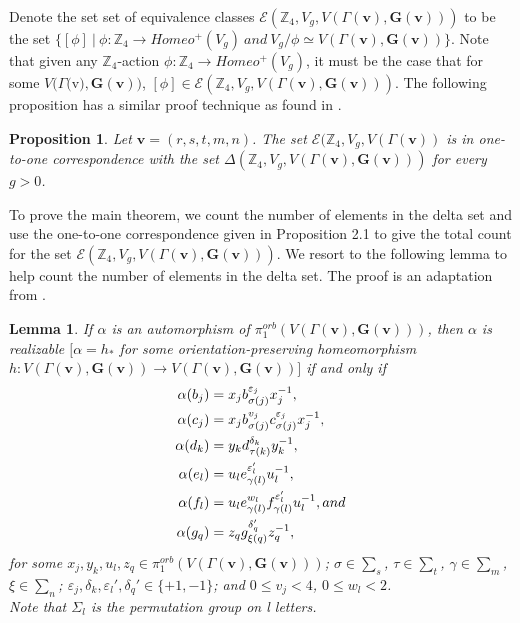 \documentclass{amsart}
\newtheorem{lemma}[theorem]{Lemma}
\newtheorem{proposition}[theorem]{Proposition}
\theoremstyle{definition}
\numberwithin{equation}{section}
\begin{document}
Denote the  set set of equivalence classes $\mathscr{E}(\mathbb{Z}_{4},V_g,V(\Gamma({\mathbf{v}}),{\mathbf{G(v)}}))$ to be the set  $\{[\phi]\ |\ \phi:\mathbb{Z}_{4}\longrightarrow{Homeo^+(V_g)}\ and\ V_g/\phi\simeq{V(\Gamma({\mathbf{v}}),{\mathbf{G(v)}})}\}$. Note that given any $\mathbb{Z}_{4}$-action $\phi:\mathbb{Z}_{4}\longrightarrow{Homeo^+(V_g)}$, it must be the case that for some $V(\Gamma($v$),{\mathbf{G(v)}})$, $[\phi]\in\mathscr{E}(\mathbb{Z}_{4},V_g,V(\Gamma({\mathbf{v}}),{\mathbf{G(v)}}))$. The following proposition has a similar proof technique as found in \cite{KM}.


\begin{proposition}
Let ${\mathbf{v}}=(r,s,t,m,n)$. The set $\mathscr{E}(\mathbb{Z}_{4},V_g,V(\Gamma({\mathbf{v}}))$ is in one-to-one correspondence with the set $\Delta(\mathbb{Z}_{4},V_g,V(\Gamma({\mathbf{v}}),{\mathbf{G(v)}}))$ for every $g>0$.
\end{proposition}

To prove the main theorem, we count the number of elements in the delta set and use the one-to-one correspondence given in Proposition 2.1 to give the total count for the set $\mathscr{E}(\mathbb{Z}_{4},V_g,V(\Gamma({\mathbf{v}}),{\mathbf{G(v)}}))$. We resort to the following lemma to help count the number of elements in the delta set. The proof is an adaptation from \cite{KM}.


\begin{lemma}
\label{real}
If $\alpha$ is an automorphism of $\pi_1^{orb}(V(\Gamma({\mathbf{v}}),\mathbf{G(v)}))$, then $\alpha$ is realizable $[\alpha=h_*$ for some orientation-preserving homeomorphism $h:V(\Gamma({\mathbf{v}}),{\mathbf{G(v)}})\longrightarrow{V(\Gamma({\mathbf{v}}),{\mathbf{G(v)}})}]$ if and only if 
\begin{align}
\alpha(b_j)&=x_jb_{\sigma(j)}^{\varepsilon_j}x_j^{-1},\notag \\
\alpha(c_j)&=x_jb_{\sigma(j)}^{{v_j}}c_{\sigma(j)}^{\varepsilon_j}x_j^{-1},\notag \\
\alpha(d_k)&=y_kd_{\tau(k)}^{\delta_k}y_k^{-1},\notag \\
\alpha(e_l)&=u_le_{\gamma(l)}^{\varepsilon_l'}u_l^{-1},\notag \\
\alpha(f_l)&=u_le_{\gamma(l)}^{{w_l}}f_{\gamma(l)}^{\varepsilon_l'}u_l^{-1}, and\notag \\
\alpha(g_q)&=z_qg_{\xi(q)}^{\delta_q'}z_q^{-1},\notag
\end{align}
for some $x_j, y_k, u_l, z_q\in{\pi_1^{orb}(V(\Gamma({\mathbf{v}}),\mathbf{G(v)}))}$; $\sigma\in{\sum_s}$, $\tau\in{\sum_t}$, $\gamma\in{\sum_m}$, $\xi\in{\sum_n}$; $\varepsilon_j, \delta_k, \varepsilon_l', \delta_q'\in{\{+1,-1\}}$; and $0\leq{v_j}<4$, $0\leq{w_l}<2$.\\
Note that $\Sigma_l$ is the permutation group on l letters.
\end{lemma}
\end{document}
